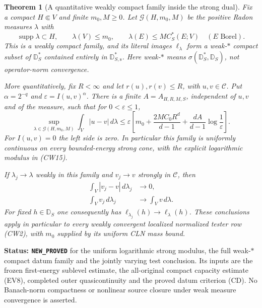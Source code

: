 \documentclass[11pt,a4paper]{article}
\numberwithin{equation}{section}
\newtheorem{theorem}{Theorem}[section]
\theoremstyle{definition}
\theoremstyle{remark}
\begin{document}
\begin{theorem}[A quantitative weakly compact family inside the strong dual]
\label{thm:r12-compact-capacity-dual-equicontinuity}
Fix a compact $H\Subset V$ and finite $m_0,M\geq0$. Let
$\mathcal G(H,m_0,M)$ be the positive Radon measures $\lambda$
with
\[
 \operatorname{supp}\lambda\subset H,\qquad
 \lambda(V)\leq m_0,\qquad
 \lambda(E)\leq M C_S^*(E;V)\quad(E\text{ Borel}).
 \tag{CW14}
\]
This is a weakly compact family, and its literal images
$\ell_\lambda$ form a weak-$*$ compact subset of
$\mathbb D_S^*$ contained entirely in
$\mathbb D_{S,\mathrm s}^*$. Here weak-$*$ means
$\sigma(\mathbb D_S^*,\mathbb D_S)$, not operator-norm
convergence.

More quantitatively, fix $R<\infty$ and let
$r(u),r(v)\leq R$, with $u,v\in\mathscr C$. Put
$\alpha=2^{-q}$ and $\varepsilon=I(u,v)^\alpha$.
There is a finite $A=A_{H,R,M,S}$, independent of $u,v$
and of the measure, such that for $0<\varepsilon\leq1$,
\[
 \sup_{\lambda\in\mathcal G(H,m_0,M)}
       \int_V|u-v|\,d\lambda
 \leq\varepsilon\left[
        m_0+\frac{2MC_0R^d}{d-1}
             +\frac{dA}{d-1}\log\frac1\varepsilon\right].
 \tag{CW15}
\]
For $I(u,v)=0$ the left side is zero. In particular this
family is uniformly continuous on every bounded-energy
strong cone, with the explicit logarithmic modulus in (CW15).

If $\lambda_j\to\lambda$ weakly in this family and
$v_j\to v$ strongly in $\mathscr C$, then
\[
 \begin{split}
   \int_V|v_j-v|\,d\lambda_j&\longrightarrow0,\\
   \int_V v_j\,d\lambda_j&\longrightarrow\int_Vv\,d\lambda.
 \end{split}
 \tag{CW16}
\]
For fixed $h\in\mathbb D_S$ one consequently has
$\ell_{\lambda_j}(h)\to\ell_\lambda(h)$.
These conclusions apply in particular to every weakly
convergent localized normalized tester row (CW2), with
$m_0$ supplied by its uniform CLN mass bound.
\end{theorem}

\noindent\textbf{Status: \texttt{NEW\_PROVED}} for the
uniform logarithmic strong modulus, the full weak-$*$
compact datum family and the jointly varying test conclusion.
Its inputs are the frozen first-energy sublevel estimate,
the all-original compact capacity estimate (EV8), completed
outer quasicontinuity and the proved datum criterion (CD).
No Banach-norm compactness or nonlinear source closure under
weak measure convergence is asserted.
\end{document}
